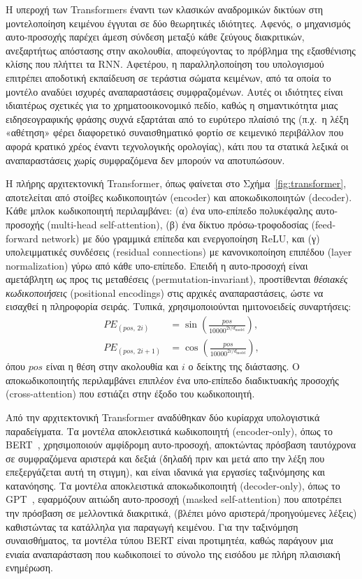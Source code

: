 Η υπεροχή των Transformers έναντι των κλασικών αναδρομικών δικτύων στη
μοντελοποίηση κειμένου έγγυται σε δύο θεωρητικές ιδιότητες. Αφενός, ο
μηχανισμός αυτο-προσοχής παρέχει άμεση σύνδεση μεταξύ κάθε ζεύγους
διακριτικών, ανεξαρτήτως απόστασης στην ακολουθία, αποφεύγοντας το πρόβλημα
της εξασθένισης κλίσης που πλήττει τα RNN. Αφετέρου, η παραλληλοποίηση του
υπολογισμού επιτρέπει αποδοτική εκπαίδευση σε τεράστια σώματα κειμένων, από τα
οποία το μοντέλο αναδύει ισχυρές αναπαραστάσεις συμφραζομένων. Αυτές οι
ιδιότητες είναι ιδιαιτέρως σχετικές για το χρηματοοικονομικό πεδίο, καθώς η
σημαντικότητα μιας ειδησεογραφικής φράσης συχνά εξαρτάται από το ευρύτερο
πλαίσιό της (π.χ.\ η λέξη «αθέτηση» φέρει διαφορετικό συναισθηματικό φορτίο
σε κειμενικό περιβάλλον που αφορά κρατικό χρέος έναντι τεχνολογικής ορολογίας),
κάτι που τα στατικά λεξικά οι αναπαραστάσεις χωρίς συμφραζόμενα δεν μπορούν
να αποτυπώσουν.

Η πλήρης αρχιτεκτονική Transformer, όπως φαίνεται στο Σχήμα~\ref{fig:transformer}, 
αποτελείται από στοίβες κωδικοποιητών (encoder) και αποκωδικοποιητών (decoder). 
Κάθε μπλοκ κωδικοποιητή περιλαμβάνει: (α) ένα υπο-επίπεδο πολυκέφαλης αυτο-προσοχής
(multi-head self-attention), (β) ένα δίκτυο πρόσω-τροφοδοσίας (feed-forward
network) με δύο γραμμικά επίπεδα και ενεργοποίηση ReLU, και (γ) υπολειμματικές
συνδέσεις (residual connections) με κανονικοποίηση επιπέδου (layer normalization)
γύρω από κάθε υπο-επίπεδο. Επειδή η αυτο-προσοχή είναι αμετάβλητη ως προς τις
μεταθέσεις (permutation-invariant), προστίθενται \emph{θέσιακές κωδικοποιήσεις}
(positional encodings) στις αρχικές αναπαραστάσεις, ώστε να εισαχθεί η
πληροφορία σειράς. Τυπικά, χρησιμοποιούνται ημιτονοειδείς συναρτήσεις:
\begin{align}
    PE_{(pos,\,2i)} &= \sin\!\left(\frac{pos}{10000^{2i/d_{\text{model}}}}\right), \\
    PE_{(pos,\,2i+1)} &= \cos\!\left(\frac{pos}{10000^{2i/d_{\text{model}}}}\right),
\end{align}
όπου $pos$ είναι η θέση στην ακολουθία και $i$ ο δείκτης της διάστασης. Ο
αποκωδικοποιητής περιλαμβάνει επιπλέον ένα υπο-επίπεδο διαδικτυακής προσοχής
(cross-attention) που εστιάζει στην έξοδο του κωδικοποιητή.

Από την αρχιτεκτονική Transformer αναδύθηκαν δύο κυρίαρχα υπολογιστικά
παραδείγματα. Τα μοντέλα αποκλειστικά κωδικοποιητή (encoder-only), όπως το
BERT~\cite{devlin2019bert}, χρησιμοποιούν αμφίδρομη αυτο-προσοχή, αποκτώντας
πρόσβαση ταυτόχρονα σε συμφραζόμενα αριστερά και δεξιά (δηλαδή πριν και μετά 
απο την λέξη που επεξεργάζεται αυτή τη στιγμη), και είναι ιδανικά για
εργασίες ταξινόμησης και κατανόησης. Τα μοντέλα αποκλειστικά αποκωδικοποιητή
(decoder-only), όπως το GPT~\cite{brown2020gpt3}, εφαρμόζουν αιτιώδη αυτο-προσοχή 
(masked self-attention) που αποτρέπει την πρόσβαση σε μελλοντικά διακριτικά,
(βλέπει μόνο αριστερά/προηγούμενες λέξεις) καθιστώντας τα κατάλληλα για παραγωγή κειμένου. Για την ταξινόμηση
συναισθήματος, τα μοντέλα τύπου BERT είναι προτιμητέα, καθώς παράγουν μια
ενιαία αναπαράσταση που κωδικοποιεί το σύνολο της εισόδου με πλήρη πλαισιακή
ενημέρωση.

